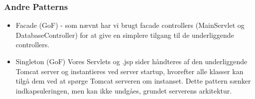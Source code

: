 \subsubsection*{Andre Patterns}
\begin{itemize}
  \item Facade (GoF)\cite[s. 461]{larman} - som nævnt har vi brugt facade
  controllers (MainServlet og DatabaseController) for at give en simplere tilgang til de underliggende
  controllers.
  \item Singleton (GoF)\cite[s. 442]{larman} Vores Servlets og .jsp sider
  håndteres af den underliggende Tomcat server og instantieres ved server
  startup, hvorefter alle klasser kan tilgå dem ved at spørge Tomcat serveren om
  instanset. Dette pattern sænker indkapsuleringen, men kan ikke undgåes,
  grundet serverens arkitektur.
\end{itemize}
